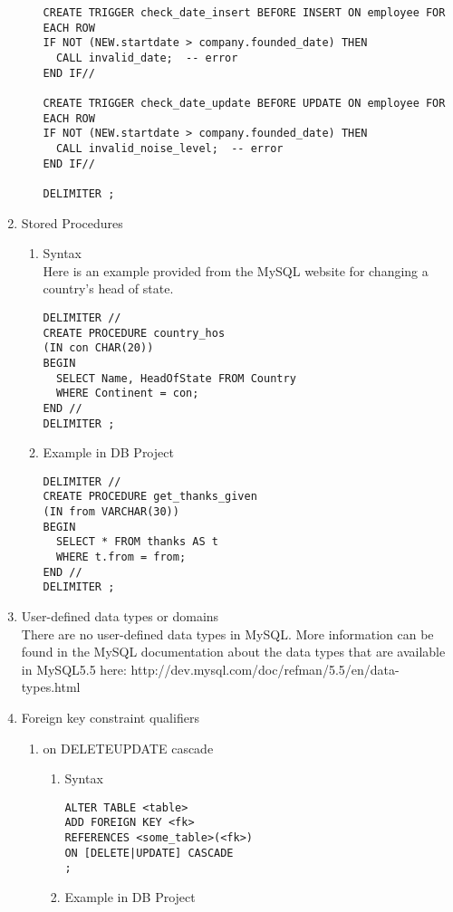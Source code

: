 \documentclass{article}
\begin{document}
\begin{enumerate}
\begin{enumerate}
\begin{verbatim}
CREATE TRIGGER check_date_insert BEFORE INSERT ON employee FOR EACH ROW
IF NOT (NEW.startdate > company.founded_date) THEN
  CALL invalid_date;  -- error
END IF//

CREATE TRIGGER check_date_update BEFORE UPDATE ON employee FOR EACH ROW
IF NOT (NEW.startdate > company.founded_date) THEN
  CALL invalid_noise_level;  -- error
END IF//

DELIMITER ;
        \end{verbatim}
    \end{enumerate}
    \pagebreak
    \item Stored Procedures
    \begin{enumerate}
        \item Syntax \\
        Here is an example provided from the MySQL website for changing a country's head of state.
        \begin{verbatim}
DELIMITER //
CREATE PROCEDURE country_hos
(IN con CHAR(20))
BEGIN
  SELECT Name, HeadOfState FROM Country
  WHERE Continent = con;
END //
DELIMITER ;
        \end{verbatim}
        \item Example in DB Project
        \begin{verbatim}
DELIMITER //
CREATE PROCEDURE get_thanks_given
(IN from VARCHAR(30))
BEGIN
  SELECT * FROM thanks AS t
  WHERE t.from = from;
END //
DELIMITER ;
        \end{verbatim}
    \end{enumerate}
    \item User-defined data types or domains \\
    There are no user-defined data types in MySQL. More information can be found in the MySQL documentation about the data types that are available in MySQL5.5 here: http://dev.mysql.com/doc/refman/5.5/en/data-types.html
    \item Foreign key constraint qualifiers
    \begin{enumerate}
        \item on DELETE\textbar UPDATE cascade
        \begin{enumerate}
            \item Syntax
            \begin{verbatim}
ALTER TABLE <table>
ADD FOREIGN KEY <fk>
REFERENCES <some_table>(<fk>)
ON [DELETE|UPDATE] CASCADE
;
            \end{verbatim}
            \pagebreak
            \item Example in DB Project

\end{enumerate}
\end{enumerate}
\end{enumerate}
\end{document}
